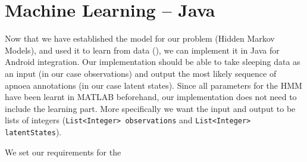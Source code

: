 \section{Machine Learning -- Java}
\label{sec:mljava}

Now that we have established the model for our problem (Hidden Markov Models), and used it to learn from data (), we can implement it in Java for Android integration. Our implementation should be able to take sleeping data as an input (in our case observations) and output the most likely sequence of apnoea annotations (in our case latent states). Since all parameters for the HMM have been learnt in MATLAB beforehand, our implementation does not need to include the learning part. More specifically we want the input and output to be lists of integers (\verb!List<Integer> observations! and \verb!List<Integer> latentStates!).

We set our requirements for the 